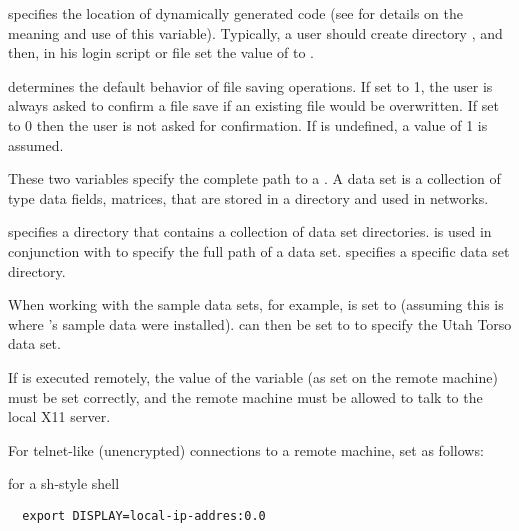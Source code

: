 \begin{description}
   specifies the location of
  dynamically generated code (see  for details on the meaning and use of
  this variable).  Typically, a user should create directory
  , and then, in his login script or
   file set the value of 
   to .
  
   determines the default behavior of
  file saving operations.  If set to 1, the user is always
  asked to confirm a file save if an existing file would be
  overwritten.  If set to 0 then the user is not asked for
  confirmation.  If  is undefined, a
  value of 1 is assumed.
  
   These
  two variables specify the complete path to a \sr{} . A
  data set is a collection of \sr{} type data fields, matrices, \etc{}
  that are stored in a directory and used in \sr{} networks.

   specifies a directory that contains a
  collection of data set directories.   is used in
  conjunction with  to specify the full path of
  a data set.   specifies a specific data set
  directory. 

  When working with the sample \sr{} data sets, for example,
   is set to
   (assuming this is where \sr{}'s
  sample data were installed).   can then be
  set to  to specify the Utah Torso data set.
  
   If \sr{} is executed remotely, the value of
  the  variable (as set on the remote machine) must be
  set correctly, and the remote machine must be allowed to talk to the
  local X11 server.
  
  For telnet-like (unencrypted) connections to a remote machine,
 set  as follows:

for a sh-style shell

\begin{verbatim}
  export DISPLAY=local-ip-addres:0.0
\end{verbatim}
  

\end{description}
